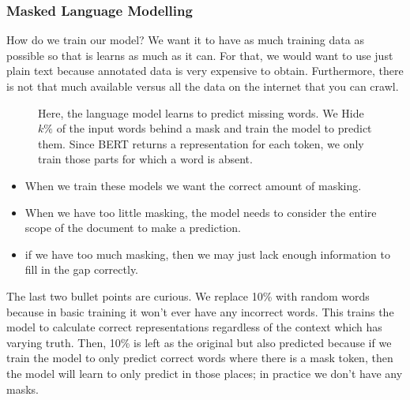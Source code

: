 \documentclass[11pt]{article}
\begin{document}
\subsubsection{Masked Language Modelling}

How do we train our model? We want it to have as much training data as possible so that is learns as much as it can. For that, we would want to use just plain text because annotated data is very expensive to obtain. Furthermore, there is not that much available versus all the data on the internet that you can crawl.

\begin{figure}[H]
    \centering
    \caption*{Here, the language model learns to predict missing words. We Hide $k\%$ of the input words behind a mask and train the model to predict them. Since BERT returns a representation for each token, we only train those parts for which a word is absent.}
\end{figure}    

\begin{minipage}[l]{.5\linewidth}
    \begin{figure}[H]
        \centering
    \end{figure}    
\end{minipage}\hfill
\begin{minipage}[r]{.48\linewidth}
    \begin{itemize}
        \item When we train these models we want the correct amount of masking. 
        \item When we have too little masking, the model needs to consider the entire scope of the document to make a prediction. 
        \item if we have too much masking, then we may just lack enough information to fill in the gap correctly.
    \end{itemize}
\end{minipage}

The last two bullet points are curious. We replace 10\% with random words because in basic training it won't ever have any incorrect words. This trains the model to calculate correct representations regardless of the context which has varying truth. Then, 10\% is left as the original but also predicted because if we train the model to only predict correct words where there is a mask token, then the model will learn to only predict in those places; in practice we don't have any masks.
\end{document}
